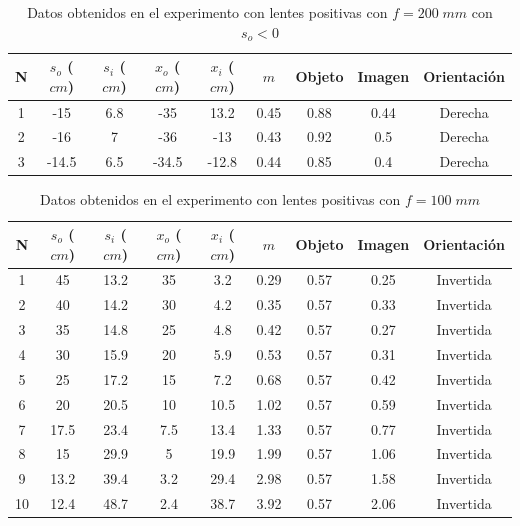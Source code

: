 \documentclass[13,twocolumn,letterpaper]{article}
\begin{document}
\begin{table}[htb]
	\centering
	\begin{tabular}{|| c | c | c | c | c | c | c | c | c ||} 
	\hline \hline
		N & $s_{o}$ ($cm$) & $s_{i}$ ($cm$) & $x_{o}$  ($cm$) & $x_{i}$ ($cm$) & $m$ & Objeto & Imagen & Orientación \\ \hline \hline
		1 & -15 & 6.8	 & -35 	& 13.2 	& 0.45 & 0.88  	& 0.44 & Derecha \\
		2 &  -16	 & 7 	 & -36 	& -13 	& 0.43 & 0.92 	& 0.5 & Derecha \\
		3 &   -14.5 & 6.5  & -34.5 	& -12.8 	& 0.44 & 0.85 	& 0.4 & Derecha \\ \hline
	\end{tabular}
	\caption{Datos obtenidos en el experimento con lentes positivas con $f=200\;mm$ con $s_{o}<0$} \label{tabla2}
\end{table}


\begin{table}[h]
\centering 
\begin{tabular}{|| c | c | c | c | c | c | c | c | c ||}
\hline \hline
	N & $s_{o}$ ($cm$) & $s_{i}$ ($cm$) & $x_{o}$  ($cm$) & $x_{i}$ ($cm$) & $m$ & Objeto & Imagen & Orientación  \\
\hline \hline 
	1 &  45 	& 13.2 	& 35 	& 3.2	& 0.29 & 0.57  & 0.25 & Invertida   \\
	2 &  40 	& 14.2 	& 30 	& 4.2	& 0.35	& 0.57  & 0.33 & Invertida   \\
	3 &  35 	& 14.8 	& 25 	& 4.8	& 0.42	& 0.57  & 0.27 & Invertida   \\
	4 &  30 	& 15.9 	& 20 	& 5.9	& 0.53	& 0.57  & 0.31 & Invertida   \\
	5 &  25 	& 17.2 	& 15 	& 7.2	& 0.68	& 0.57  & 0.42 & Invertida   \\
	6 &  20 	& 20.5 	& 10 	& 10.5	& 1.02	& 0.57  & 0.59 & Invertida   \\
	7 &  17.5 	& 23.4 	& 7.5 	& 13.4 	& 1.33	& 0.57  & 0.77 & Invertida   \\
	8 &  15 	& 29.9 	& 5 	& 19.9	& 1.99	& 0.57  & 1.06 & Invertida   \\ 
	9 &  13.2 	& 39.4 	& 3.2 	& 29.4	& 2.98	& 0.57  & 1.58 & Invertida   \\
	10 &  12.4 	& 48.7 	& 2.4 	& 38.7	& 3.92	& 0.57  & 2.06 & Invertida   \\\hline
\end{tabular}
\caption{Datos obtenidos en el experimento con lentes positivas con $f=100\;mm$} 
\end{table}
\end{document}
